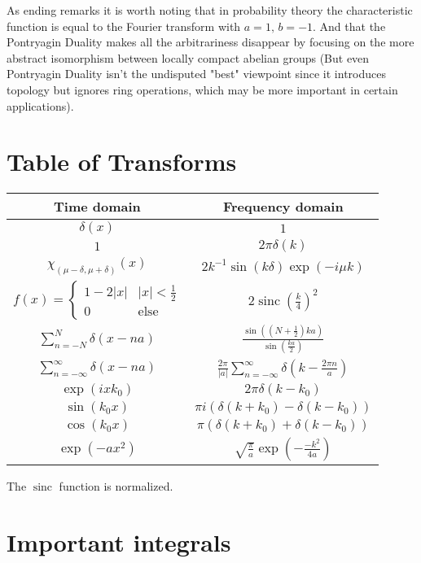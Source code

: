 \documentclass[12pt]{report}
\DeclareMathOperator{\sinc}{sinc}
\begin{document}
As ending remarks it is worth noting that in probability theory the characteristic function is equal to the Fourier transform with $a=1,\,b=-1$. 
And that the Pontryagin Duality makes all the arbitrariness disappear by focusing on the more abstract isomorphism between locally compact abelian groups (But even Pontryagin Duality isn't the undisputed "best" viewpoint since it introduces topology but ignores ring operations, which may be more important in certain applications).

\section{Table of Transforms}

\begin{center}
\begin{tabular}{c|c}
	Time domain & Frequency domain \\ \hline
	$\delta(x)$  & $1$ \\
	$1$ & $2\pi\delta(k)$ \\
	$\chi_{(\mu-\delta,\mu+\delta)}(x)$ & $2k^{-1}\sin\left(k\delta\right)\exp(-i\mu k)$ \\
	$f(x) = \begin{cases} 1-2|x|& |x| <\frac{1}{2}\\ 0& \text{else}\end{cases}$ & $2\sinc\left(\frac{k}{4}\right)^2$ \\
	$\sum_{n=-N}^N\delta(x-na)$ & $\frac{\sin\left(\left(N+\frac{1}{2}\right)ka\right)}{\sin\left(\frac{ka}{2}\right)}$\\
	$\sum_{n=-\infty}^\infty\delta(x-na) $ & $\frac{2\pi}{|a|}\sum_{n=-\infty}^\infty\delta\left(k-\frac{2\pi n}{a}\right)$  \\
	$\exp(ixk_0)$ & $ 2\pi\delta(k-k_0)$ \\
	$\sin(k_0x)$ & $\pi i (\delta(k+k_0)-\delta(k-k_0))$\\
	$\cos(k_0x)$ & $\pi  (\delta(k+k_0)+\delta(k-k_0))$\\
	$\exp(-ax^2)$&$ \sqrt{\frac{\pi}{a}}\exp\left(-\frac{-k^2}{4a}\right)$ \\
\end{tabular}
\end{center}

The $\sinc$ function is normalized.

\section{Important integrals}
\end{document}
